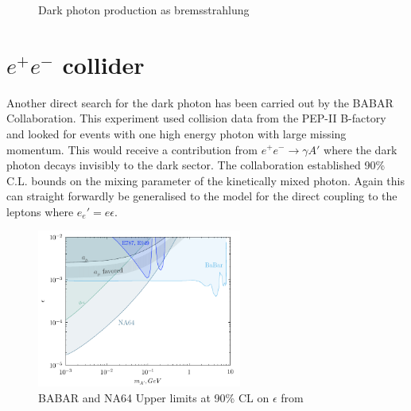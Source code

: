 \begin{figure}[H]
\centering
{}
\caption{Dark photon production as bremsstrahlung}
\label{fg:DP-Porduction}
\end{figure}
\section{\texorpdfstring{$e^+ e^-$}{e+e-} collider}
Another direct search for the dark photon has been carried out by the BABAR Collaboration. This experiment used collision data from the PEP-II B-factory and looked for events with one high energy photon with large missing momentum. This would receive a contribution from $e^+e^-\rightarrow \gamma A'$ where the dark photon decays invisibly to the dark sector. The collaboration established 90\% C.L. bounds on the mixing parameter of the kinetically mixed photon. Again this can straight forwardly be generalised to the model for the direct coupling to the leptons where $e_e'=e\epsilon$.
\begin{figure}[H]
  \centering
    \includegraphics[width=0.6\textwidth]{imgs/exclusionInvisible-1909}
    \caption{BABAR and NA64 Upper limits at 90\% CL on $\epsilon$ from \cite{Banerjee:2018vgk}}
    \label{fg:BABAR}
\end{figure}
